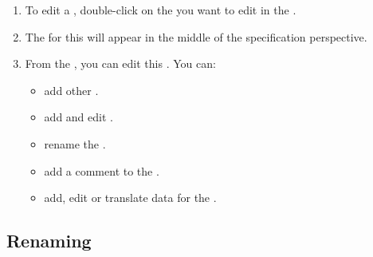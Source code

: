 
\begin{enumerate}
\item To edit a \gdcase{}, double-click on the \gdcase{} you want to edit in the \gdtestcasebrowser{}. 
\item The \gdtestcaseeditor{} for this \gdcase{} will appear in the middle of the specification perspective. 

\item From the \gdtestcaseeditor{}, you can edit this \gdcase{}. You can:

\begin{itemize}
\item add other \gdcases{} .
\item add and edit \gdsteps{} .
\item rename the \gdcase{} .
\item add a comment to the \gdcase{} .
\item add, edit or translate data for the \gdcase{} . 
\end{itemize}
\end{enumerate}

\subsection{Renaming \gdcases}
\label{renamingtc}
